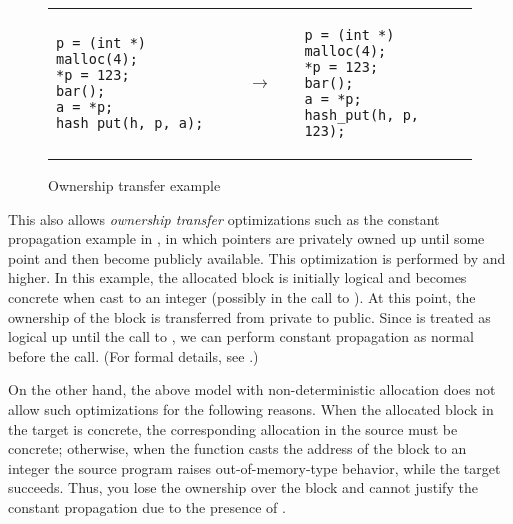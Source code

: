 \begin{figure}[t]
\small
\center
\begin{tabular}{lll}
\begin{minipage}{0.3\textwidth}
\begin{verbatim}
p = (int *) malloc(4);
*p = 123;
bar();
a = *p;
hash_put(h, p, a);
\end{verbatim}
\end{minipage}
&
$\quad\rightarrow\quad$
&
\begin{minipage}{0.3\textwidth}
\begin{verbatim}
p = (int *) malloc(4);
*p = 123;
bar();
a = *p;
hash_put(h, p, 123);
\end{verbatim}
\end{minipage}
\end{tabular}
\caption{Ownership transfer example}\label{fig:intptrcast:formal-semantics:ownership}
\end{figure}

This also allows \emph{ownership transfer} optimizations such as the
constant propagation example in , in which
pointers are privately owned up until some point and then become
publicly available.  
This optimization is performed by  and higher.
In this example,
the allocated block is initially logical and becomes concrete when cast to an
integer (possibly in the call to ). At this point, the ownership of the block is transferred from
private to public. Since  is treated as logical up until the
call to , we can perform constant propagation as
normal before the call. (For formal details, see .)

On the other hand, the above model with
non-deterministic allocation does not allow such optimizations for the following reasons.
When the allocated block in the target is concrete, the
  corresponding allocation in the source must be concrete; otherwise,
  when the function  casts the address of the block to
  an integer the source program raises out-of-memory-type behavior, while the target succeeds.
Thus, you lose the ownership over the block and cannot justify the constant propagation due to the presence of .



